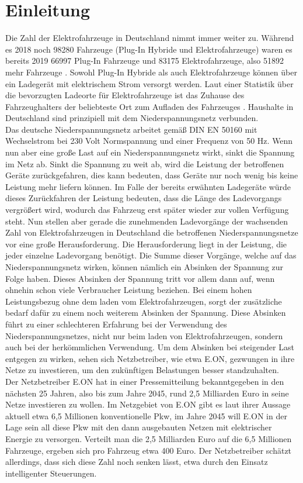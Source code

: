 \chapter{Einleitung}

Die Zahl der Elektrofahrzeuge in Deutschland nimmt immer weiter zu. Während es 2018 noch 98280 Fahrzeuge (Plug-In Hybride und Elektrofahrzeuge) waren es bereits 2019 66997 Plug-In Fahrzeuge und 83175 Elektrofahrzeuge, also 51892 mehr Fahrzeuge \cite{intro_stat_1}. Sowohl Plug-In Hybride als auch Elektrofahrzeuge können über ein Ladegerät mit elektrischem Strom versorgt werden. Laut einer Statistik über die bevorzugten Ladeorte für Elektrofahrzeuge ist das Zuhause des Fahrzeughalters der beliebteste Ort zum Aufladen des Fahrzeuges \cite{intro_stat_2}. Haushalte in Deutschland sind prinzipiell mit dem Niederspannungsnetz verbunden. \\
Das deutsche Niederspannungsnetz arbeitet gemäß DIN EN 50160 mit Wechselstrom bei 230 Volt Normspannung und einer Frequenz von 50 Hz. Wenn nun aber eine große Last auf ein Niederspannungsnetz wirkt, sinkt die Spannung im Netz ab. Sinkt die Spannung zu weit ab, wird die Leistung der betroffenen Geräte zurückgefahren, dies kann bedeuten, dass Geräte nur noch wenig bis keine Leistung mehr liefern können. Im Falle der bereits erwähnten Ladegeräte würde dieses Zurückfahren der Leistung bedeuten, dass die Länge des Ladevorgangs vergrößert wird, wodurch das Fahrzeug erst später wieder zur vollen Verfügung steht. Nun stellen aber gerade die zunehmenden Ladevorgänge der wachsenden Zahl von Elektrofahrzeugen in Deutschland die betroffenen Niederspannungsnetze vor eine große Herausforderung. Die Herausforderung liegt in der Leistung, die jeder einzelne Ladevorgang benötigt. Die Summe dieser Vorgänge, welche auf das Niederspannungsnetz wirken, können nämlich ein Absinken der Spannung zur Folge haben. Dieses Absinken der Spannung tritt vor allem dann auf, wenn ohnehin schon viele Verbraucher Leistung beziehen. Bei einem hohen Leistungsbezug ohne dem laden vom Elektrofahrzeugen, sorgt der zusätzliche bedarf dafür zu einem noch weiterem Absinken der Spannung. Diese Absinken führt zu einer schlechteren Erfahrung bei der Verwendung des Niederspannungsnetzes, nicht nur beim laden von Elektrofahrzeugen, sondern auch bei der herkömmlichen Verwendung. Um dem Absinken bei steigender Last entgegen zu wirken, sehen sich Netzbetreiber, wie etwa E.ON, gezwungen in ihre Netze zu investieren, um den zukünftigen Belastungen besser standzuhalten. \\
Der Netzbetreiber E.ON hat in einer Pressemitteilung \cite{eon_presse} bekanntgegeben in den nächsten 25 Jahren, also bis zum Jahre 2045, rund 2,5 Milliarden Euro in seine Netze investieren zu wollen. Im Netzgebiet von E.ON gibt es laut ihrer Aussage aktuell etwa 6,5 Millionen konventionelle Pkw, im Jahre 2045 will E.ON in der Lage sein all diese Pkw mit den dann ausgebauten Netzen mit elektrischer Energie zu versorgen. Verteilt man die 2,5 Milliarden Euro auf die 6,5 Millionen Fahrzeuge, ergeben sich pro Fahrzeug etwa 400 Euro. Der Netzbetreiber schätzt allerdings, dass sich diese Zahl noch senken lässt, etwa durch den Einsatz intelligenter Steuerungen. \\

